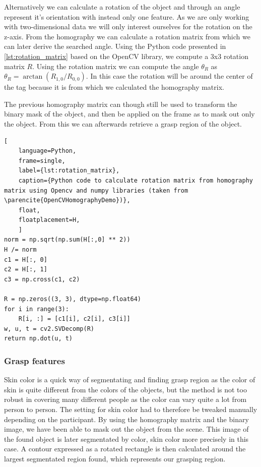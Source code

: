 Alternatively we can calculate a rotation of the object and through an angle represent it's orientation with instead only one feature. As we are only working with two-dimensional data we will only interest ourselves for the rotation on the z-axis. From the homography we can calculate a rotation matrix from which we can later derive the searched angle. Using the Python code presented in \ref{lst:rotation_matrix} based on the OpenCV library, we compute a 3x3 rotation matrix \(R\). Using the rotation matrix we can compute the angle \(\theta_R\) as \(\theta_R = \arctan(R_{1,0} / R_{0,0})\). In this case the rotation will be around the center of the tag because it is from which we calculated the homography matrix.

The previous homography matrix can though still be used to transform the binary mask of the object, and then be applied on the frame as to mask out only the object. From this we can afterwards retrieve a grasp region of the object.

\begin{lstlisting}[
	language=Python,
	frame=single,
	label={lst:rotation_matrix},
	caption={Python code to calculate rotation matrix from homography matrix using Opencv and numpy libraries (taken from \parencite{OpenCVHomographyDemo})},
	float,
	floatplacement=H,
	]
norm = np.sqrt(np.sum(H[:,0] ** 2))
H /= norm
c1 = H[:, 0]
c2 = H[:, 1]
c3 = np.cross(c1, c2)

R = np.zeros((3, 3), dtype=np.float64)
for i in range(3):
	R[i, :] = [c1[i], c2[i], c3[i]]
w, u, t = cv2.SVDecomp(R)
return np.dot(u, t)
\end{lstlisting}

\subsubsection{Grasp features}

Skin color is a quick way of segmentating and finding grasp region as the color of skin is quite different from the colors of the objects, but the method is not too robust in covering many different people as the color can vary quite a lot from person to person. The setting for skin color had to therefore be tweaked manually depending on the participant. By using the homography matrix and the binary image, we have been able to mask out the object from the scene. This image of the found object is later segmentated by color, skin color more precisely in this case. A contour expressed as a rotated rectangle is then calculated around the largest segmentated region found, which represents our grasping region.


